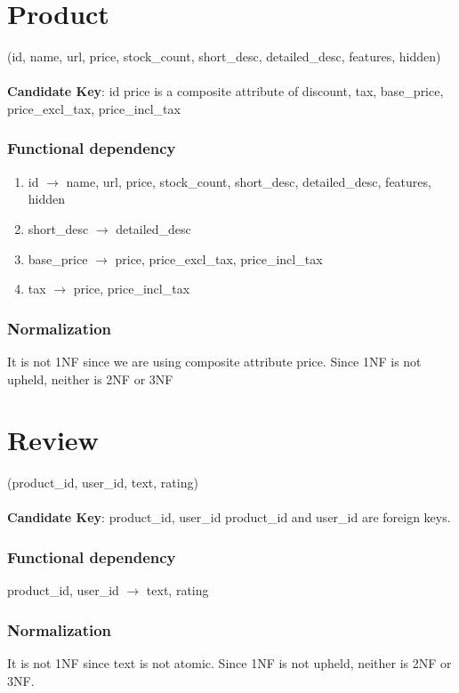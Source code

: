 \documentclass{article}
\begin{document}
\section{Product}
(id, name, url, price, stock\_count, short\_desc, detailed\_desc, features, hidden)\\\\
\textbf{Candidate Key}: id
price is a composite attribute of discount, tax, base\_price, price\_excl\_tax, price\_incl\_tax


\subsubsection*{Functional dependency}
\begin{enumerate}[$\bullet$]
\item
  
id $\rightarrow$ name, url, price, stock\_count, short\_desc, detailed\_desc, features, hidden
\item
short\_desc $\rightarrow$ detailed\_desc

\item
base\_price $\rightarrow$ price, price\_excl\_tax,
price\_incl\_tax

\item
tax  $\rightarrow$ price, price\_incl\_tax
\end{enumerate}
\subsubsection*{Normalization}
It is not 1NF since we are using composite attribute price. Since 1NF is not upheld, neither is 2NF or 3NF


\section{Review}
(product\_id, user\_id, text, rating)\\\\
\textbf{Candidate Key}: {product\_id, user\_id}
product\_id and user\_id are foreign keys.

\subsubsection*{Functional dependency}
product\_id, user\_id $\rightarrow$ text, rating
\subsubsection*{Normalization}
It is not 1NF since text is not atomic. Since 1NF is not upheld, neither is 2NF or 3NF.
\end{document}
